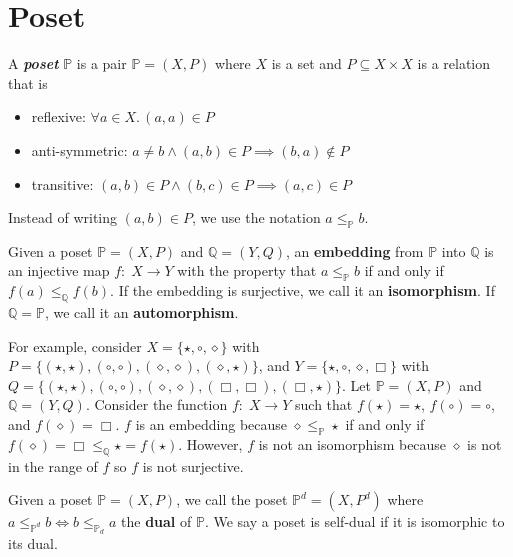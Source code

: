 \section{Poset}

\begin{definition}
    A \textit{\textbf{poset}} $\mathbb{P}$ is a pair $\mathbb{P} = (X,P)$ where $X$ is a set and $P \subseteq X \times X$ is a relation that is
    \begin{itemize}
        \item reflexive: $\forall a \in X.\, (a,a) \in P$
        \item anti-symmetric: $a \neq b \land (a,b) \in P \implies (b,a) \not\in P$
        \item transitive: $(a,b) \in P \land (b,c) \in P \implies (a,c) \in P$
    \end{itemize}
\end{definition}

Instead of writing $(a,b) \in P$, we use the notation $a \leq_{\mathbb{P}} b$.

\begin{definition}
    Given a poset $\mathbb{P} = (X,P)$ and $\mathbb{Q} = (Y,Q)$, an \textbf{embedding} from $\mathbb{P}$ into $\mathbb{Q}$ is an injective map $f:\; X \to Y$ with the property that $a \leq_{\mathbb{P}} b$ if and only if $f(a) \leq_{\mathbb{Q}} f(b)$. If the embedding is surjective, we call it an \textbf{isomorphism}. If $\mathbb{Q} = \mathbb{P}$, we call it an \textbf{automorphism}.
\end{definition}

For example, consider $X = \{\star, \circ, \diamond \}$ with $P = \{ (\star,\star), (\circ,\circ), (\diamond, \diamond), (\diamond, \star) \}$, and $Y = \{\star, \circ, \diamond, \Box \}$ with $Q = \{ (\star,\star), (\circ,\circ), (\diamond,\diamond), (\Box,\Box), (\Box,\star) \}$. Let $\mathbb{P} = (X,P)$ and $\mathbb{Q} = (Y,Q)$. Consider the function $f:\; X \to Y$ such that $f(\star) = \star$, $f(\circ) = \circ$, and $f(\diamond) = \Box$. $f$ is an embedding because $\diamond \leq_{\mathbb{P}} \star$ if and only if $f(\diamond) = \Box \leq_{\mathbb{Q}} \star = f(\star)$. However, $f$ is not an isomorphism because $\diamond$ is not in the range of $f$ so $f$ is not surjective.

\begin{definition}[Dual]
    Given a poset $\mathbb{P} = (X,P)$, we call the poset $\mathbb{P}^d = (X,P^d)$ where $a \leq_{\mathbb{P}^d} b \iff b \leq_{\mathbb{P}_d} a$ the \textbf{dual} of $\mathbb{P}$. We say a poset is self-dual if it is isomorphic to its dual.
\end{definition}

